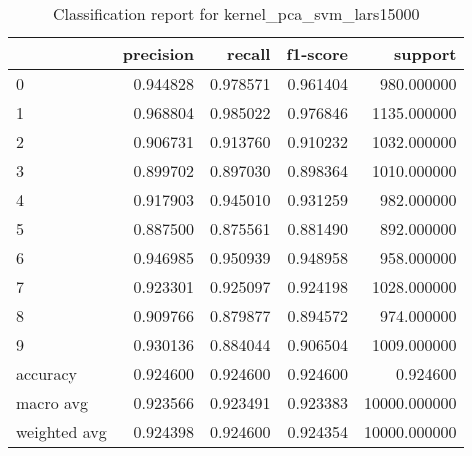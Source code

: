 \begin{table}[htb!]
\centering
\caption{Classification report for kernel_pca_svm_lars15000}
\label{tab:classification-report-kernel_pca_svm_lars15000}
\begin{tabular}{lrrrr}
\toprule
 & precision & recall & f1-score & support \\
\midrule
0 & 0.944828 & 0.978571 & 0.961404 & 980.000000 \\
1 & 0.968804 & 0.985022 & 0.976846 & 1135.000000 \\
2 & 0.906731 & 0.913760 & 0.910232 & 1032.000000 \\
3 & 0.899702 & 0.897030 & 0.898364 & 1010.000000 \\
4 & 0.917903 & 0.945010 & 0.931259 & 982.000000 \\
5 & 0.887500 & 0.875561 & 0.881490 & 892.000000 \\
6 & 0.946985 & 0.950939 & 0.948958 & 958.000000 \\
7 & 0.923301 & 0.925097 & 0.924198 & 1028.000000 \\
8 & 0.909766 & 0.879877 & 0.894572 & 974.000000 \\
9 & 0.930136 & 0.884044 & 0.906504 & 1009.000000 \\
accuracy & 0.924600 & 0.924600 & 0.924600 & 0.924600 \\
macro avg & 0.923566 & 0.923491 & 0.923383 & 10000.000000 \\
weighted avg & 0.924398 & 0.924600 & 0.924354 & 10000.000000 \\
\bottomrule
\end{tabular}
\end{table}
